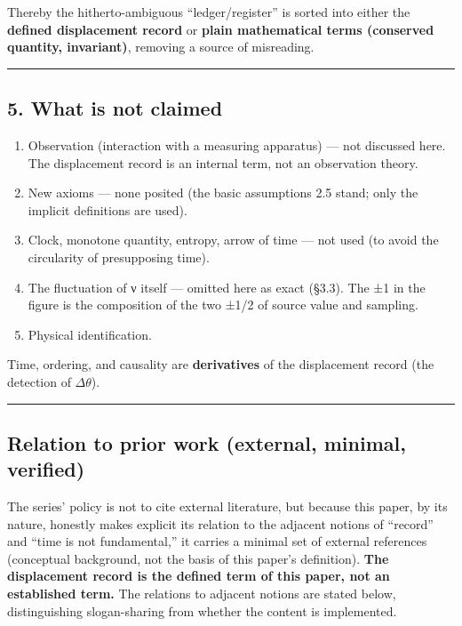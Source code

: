 \documentclass[
]{ltjsarticle}
\newcounter{none} %
\providecommand{\tightlist}{%
  \setlength{\itemsep}{0pt}\setlength{\parskip}{0pt}}
\begin{document}
Thereby the hitherto-ambiguous ``ledger/register'' is sorted into either
the \textbf{defined displacement record} or \textbf{plain mathematical
terms (conserved quantity, invariant)}, removing a source of misreading.

\begin{center}\rule{0.5\linewidth}{0.5pt}\end{center}

\subsection{5. What is not claimed}\label{what-is-not-claimed}

\begin{enumerate}
\def\labelenumi{(\roman{enumi})}
\tightlist
\item
  Observation (interaction with a measuring apparatus) --- not discussed
  here. The displacement record is an internal term, not an observation
  theory.
\item
  New axioms --- none posited (the basic assumptions 2.5 stand; only the
  implicit definitions are used).
\item
  Clock, monotone quantity, entropy, arrow of time --- not used (to
  avoid the circularity of presupposing time).
\item
  The fluctuation of ν itself --- omitted here as exact (§3.3). The ±1
  in the figure is the composition of the two ±1/2 of source value and
  sampling.
\item
  Physical identification.
\end{enumerate}

Time, ordering, and causality are \textbf{derivatives} of the
displacement record (the detection of \(\Delta\theta\)).

\begin{center}\rule{0.5\linewidth}{0.5pt}\end{center}

\subsection{Relation to prior work (external, minimal,
verified)}\label{relation-to-prior-work-external-minimal-verified}

The series' policy is not to cite external literature, but because this
paper, by its nature, honestly makes explicit its relation to the
adjacent notions of ``record'' and ``time is not fundamental,'' it
carries a minimal set of external references (conceptual background, not
the basis of this paper's definition). \textbf{The displacement record
is the defined term of this paper, not an established term.} The
relations to adjacent notions are stated below, distinguishing
slogan-sharing from whether the content is implemented.
\end{document}
